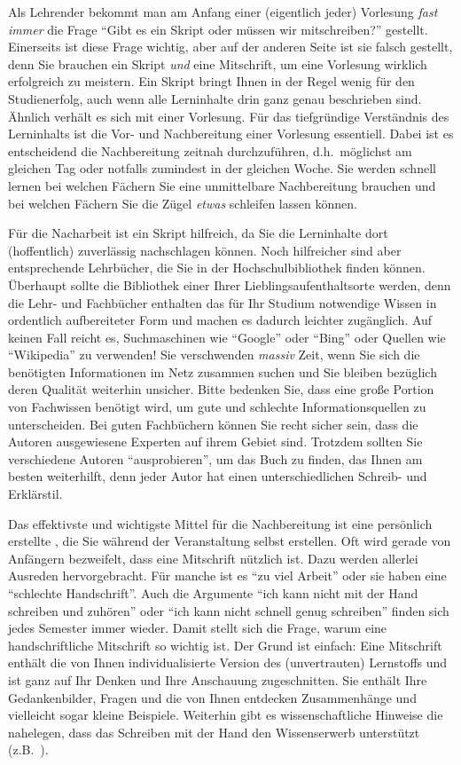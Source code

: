Als Lehrender bekommt man am Anfang einer (eigentlich jeder) Vorlesung \emph{fast immer} die 
Frage "`Gibt es ein Skript oder müssen wir mitschreiben?"' gestellt. Einerseits ist diese Frage
wichtig, aber auf der anderen Seite ist sie falsch gestellt, denn Sie brauchen ein Skript
\emph{und} eine Mitschrift, um eine Vorlesung wirklich erfolgreich zu meistern. Ein Skript 
bringt Ihnen in der Regel wenig für den Studienerfolg, auch wenn alle Lerninhalte drin ganz genau 
beschrieben sind. Ähnlich verhält es sich mit einer Vorlesung. Für das tiefgründige Verständnis des 
Lerninhalts ist die Vor- und Nachbereitung einer Vorlesung essentiell. Dabei ist es entscheidend die
Nachbereitung zeitnah durchzuführen, d.h.~möglichst am gleichen Tag oder notfalls
zumindest in der gleichen Woche. Sie werden schnell lernen bei welchen Fächern Sie eine
unmittelbare Nachbereitung brauchen und bei welchen Fächern Sie die Zügel 
\emph{etwas} schleifen lassen können.

Für die Nacharbeit ist ein Skript hilfreich, da Sie die Lerninhalte dort (hoffentlich) zuverlässig 
nachschlagen können. Noch hilfreicher sind aber entsprechende Lehrbücher, die Sie in der 
Hochschulbibliothek finden können. Überhaupt sollte die Bibliothek einer Ihrer 
Lieblingsaufenthaltsorte werden, denn die Lehr- und Fachbücher enthalten das für Ihr Studium 
notwendige Wissen in ordentlich aufbereiteter Form und machen es dadurch leichter zugänglich. Auf 
keinen Fall reicht es,  Suchmaschinen wie "`Google"' oder "`Bing"' oder 
Quellen wie "`Wikipedia"' zu verwenden! Sie  verschwenden \emph{massiv} Zeit, 
wenn Sie sich die benötigten Informationen im Netz zusammen  suchen und Sie bleiben bezüglich 
deren Qualität weiterhin unsicher. Bitte bedenken Sie, dass eine große Portion von Fachwissen benötigt 
wird, um gute und schlechte Informationsquellen zu unterscheiden. Bei guten Fachbüchern können Sie 
recht sicher sein, dass die Autoren ausgewiesene Experten auf ihrem Gebiet sind. Trotzdem sollten Sie 
verschiedene Autoren "`ausprobieren"', um das Buch zu finden, das Ihnen am besten weiterhilft, denn 
jeder Autor hat einen unterschiedlichen Schreib- und Erklärstil. 

Das effektivste und wichtigste Mittel für die Nachbereitung ist eine persönlich erstellte 
, die Sie während der Veranstaltung selbst erstellen. Oft wird gerade von Anfängern 
bezweifelt, dass eine  Mitschrift nützlich ist. Dazu werden allerlei Ausreden hervorgebracht. Für manche 
ist es "`zu viel  Arbeit"' oder sie haben eine "`schlechte Handschrift"'. Auch die Argumente "`ich kann 
nicht  mit der Hand schreiben und zuhören"' oder "`ich kann nicht schnell genug schreiben"' finden 
sich  jedes Semester immer wieder. Damit stellt sich die Frage, warum eine handschriftliche  Mitschrift 
so  wichtig ist. Der Grund ist einfach: Eine Mitschrift enthält die von Ihnen individualisierte Version 
des  (unvertrauten) Lernstoffs und ist  ganz auf Ihr Denken und Ihre Anschauung zugeschnitten. Sie 
enthält Ihre Gedankenbilder, Fragen und die von Ihnen entdecken Zusammenhänge und vielleicht 
sogar kleine Beispiele. Weiterhin gibt es wissenschaftliche Hinweise die nahelegen, dass das Schreiben 
mit der Hand den Wissenserwerb unterstützt (z.B.~\cite{MuBe14}). 

